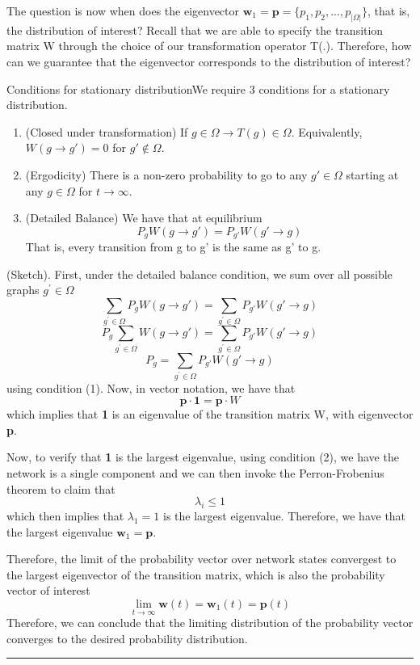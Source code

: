 \documentclass[twoside]{article}
\newenvironment{proof}{{\bf Proof:}}{\hfill\rule{2mm}{2mm}}
\begin{document}
The question is now when does the eigenvector $\textbf{w}_1 = \textbf{p} = \{p_1, p_2, ..., p_{|\Omega|}\}$, that is, the distribution of interest? Recall that we are able to specify the transition matrix W through the choice of our transformation operator T(.). Therefore, how can we guarantee that the eigenvector corresponds to the distribution of interest?

\begin{theorem_exam}{Conditions for stationary distribution}{}We require 3 conditions for a stationary distribution.
\begin{enumerate}
\item (Closed under transformation) If $g \in \Omega \rightarrow T(g) \in \Omega$. Equivalently, $W(g \rightarrow g') = 0$ for $g' \not \in \Omega.$
\item (Ergodicity) There is a non-zero probability to go to any $g' \in \Omega$ starting at any $g \in \Omega$ for $t \rightarrow \infty.$
\item (Detailed Balance) We have that at equilibrium $$P_gW(g \rightarrow g') = P_{g'}W(g' \rightarrow g)$$ That is, every transition from g to g' is the same as g' to g.
\end{enumerate}
\end{theorem_exam}

\begin{proof}(Sketch). First, under the detailed balance condition, we sum over all possible graphs $g^{'} \in \Omega$
$$
\sum_{g^{'} \in \Omega}P_gW(g \rightarrow g') = \sum_{g^{'} \in \Omega}P_{g'}W(g' \rightarrow g)
$$
$$
P_g\sum_{g^{'} \in \Omega}W(g \rightarrow g') = \sum_{g^{'} \in \Omega}P_{g'}W(g' \rightarrow g)
$$
$$
P_g = \sum_{g^{'} \in \Omega}P_{g'}W(g' \rightarrow g)
$$
using condition (1). Now, in vector notation, we have that 
$$
\textbf{p}\cdot \textbf{1} = \textbf{p}\cdot W
$$
which implies that \textbf{1} is an eigenvalue of the transition matrix W, with eigenvector \textbf{p}. 

Now, to verify that \textbf{1} is the largest eigenvalue, using condition (2), we have the network is a single component and we can then invoke the Perron-Frobenius theorem to claim that 
$$
\lambda_i \leq 1
$$
which then implies that $\lambda_1 = 1$ is the largest eigenvalue. Therefore, we have that the largest eigenvalue $\textbf{w}_1 = \textbf{p}.$

Therefore, the limit of the probability vector over network states convergest to the largest eigenvector of the transition matrix, which is also the probability vector of interest 
$$
\lim_{t \rightarrow \infty}\textbf{w}(t) = \textbf{w}_1(t) = \textbf{p}(t)
$$
Therefore, we can conclude that the limiting distribution of the probability vector converges to the desired probability distribution.
\end{proof}
\end{document}
